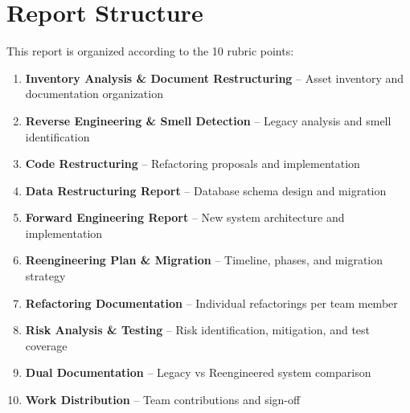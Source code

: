 \documentclass[12pt,a4paper]{report}
\begin{document}
\section*{Report Structure}

This report is organized according to the 10 rubric points:

\begin{enumerate}
  \item \textbf{Inventory Analysis \& Document Restructuring} -- Asset inventory and documentation organization
  \item \textbf{Reverse Engineering \& Smell Detection} -- Legacy analysis and smell identification
  \item \textbf{Code Restructuring} -- Refactoring proposals and implementation
  \item \textbf{Data Restructuring Report} -- Database schema design and migration
  \item \textbf{Forward Engineering Report} -- New system architecture and implementation
  \item \textbf{Reengineering Plan \& Migration} -- Timeline, phases, and migration strategy
  \item \textbf{Refactoring Documentation} -- Individual refactorings per team member
  \item \textbf{Risk Analysis \& Testing} -- Risk identification, mitigation, and test coverage
  \item \textbf{Dual Documentation} -- Legacy vs Reengineered system comparison
  \item \textbf{Work Distribution} -- Team contributions and sign-off
\end{enumerate}

\tableofcontents
\clearpage

\setcounter{page}{1}
\onehalfspacing




\end{document}
